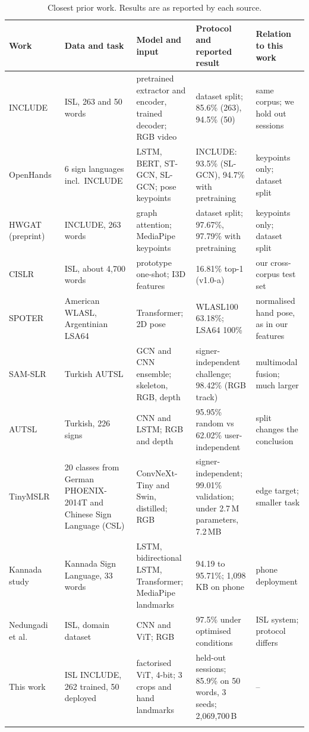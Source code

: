 \documentclass[pdflatex,sn-mathphys-num,twocolumn]{sn-jnl}
\theoremstyle{thmstyleone}%
\begin{document}
\begin{table}[t]
\caption{Closest prior work. Results are as reported by each source.}\label{tab:lit}
\scriptsize
\setlength{\tabcolsep}{2.5pt}
\begin{tabularx}{\textwidth}{@{}L{2.5cm}L{3.3cm}L{3.6cm}YL{3.3cm}@{}}
\toprule
Work & Data and task & Model and input & Protocol and reported result & Relation to this work \\
\midrule
INCLUDE~\cite{sridhar2020include} & ISL, 263 and 50 words & pretrained extractor and encoder, trained decoder; RGB video & dataset split; 85.6\% (263), 94.5\% (50) & same corpus; we hold out sessions \\\addlinespace[2.5pt]
OpenHands~\cite{selvaraj2022openhands} & 6 sign languages incl.\ INCLUDE & LSTM, BERT, ST-GCN, SL-GCN; pose keypoints & INCLUDE: 93.5\% (SL-GCN), 94.7\% with pretraining & keypoints only; dataset split \\\addlinespace[2.5pt]
HWGAT~\cite{patra2024hwgat} (preprint) & INCLUDE, 263 words & graph attention; MediaPipe keypoints & dataset split; 97.67\%, 97.79\% with pretraining & keypoints only; dataset split \\\addlinespace[2.5pt]
CISLR~\cite{joshi2022cislr} & ISL, about 4,700 words & prototype one-shot; I3D features & 16.81\% top-1 (v1.0-a) & our cross-corpus test set \\\addlinespace[2.5pt]
SPOTER~\cite{bohacek2022spoter} & American WLASL, Argentinian LSA64 & Transformer; 2D pose & WLASL100 63.18\%; LSA64 100\% & normalised hand pose, as in our features \\\addlinespace[2.5pt]
SAM-SLR~\cite{jiang2021samslr} & Turkish AUTSL & GCN and CNN ensemble; skeleton, RGB, depth & signer-independent challenge; 98.42\% (RGB track) & multimodal fusion; much larger \\\addlinespace[2.5pt]
AUTSL~\cite{sincan2020autsl} & Turkish, 226 signs & CNN and LSTM; RGB and depth & 95.95\% random vs 62.02\% user-independent & split changes the conclusion \\\addlinespace[2.5pt]
Tiny\-MSLR~\cite{lamaakal2026tinymslr} & 20 classes from German PHOENIX-2014T and Chinese Sign Language (CSL) & ConvNeXt-Tiny and Swin, distilled; RGB & signer-independent; 99.01\% validation; under 2.7\,M parameters, 7.2\,MB & edge target; smaller task \\\addlinespace[2.5pt]
Kannada study~\cite{venkatappa2026kannada} & Kannada Sign Language, 33 words & LSTM, bidirectional LSTM, Transformer; MediaPipe landmarks & 94.19 to 95.71\%; 1,098\,KB on phone & phone deployment \\\addlinespace[2.5pt]
Nedungadi et al.~\cite{nedungadi2025vit} & ISL, domain dataset & CNN and ViT; RGB & 97.5\% under optimised conditions & ISL system; protocol differs \\
\midrule
This work & ISL INCLUDE, 262 trained, 50 deployed & factorised ViT, 4-bit; 3 crops and hand landmarks & held-out sessions; 85.9\% on 50 words, 3 seeds; 2,069,700\,B & -- \\
\botrule
\end{tabularx}
\end{table}
\end{document}
